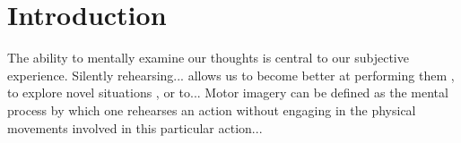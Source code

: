 \documentclass[utf8]{template/frontiersSCNS} %
\begin{document}
\newpage

\section{Introduction}


The ability to mentally examine our thoughts is central to our subjective experience. Silently rehearsing... allows us to become better at performing them \cite{}, to explore novel situations \cite{}, or to... Motor imagery can be defined as the mental process by which one rehearses an action without engaging in the physical movements involved in this particular action...

\end{document}
